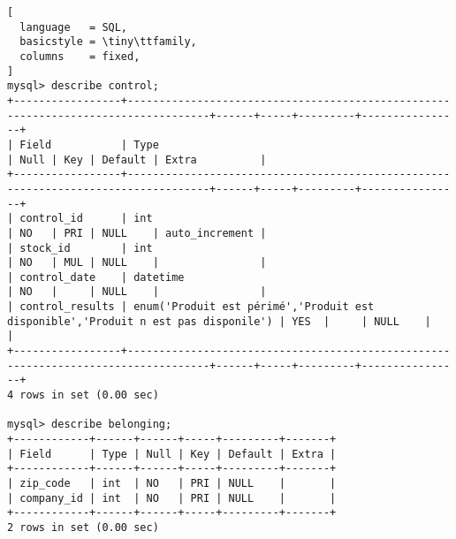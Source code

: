 \begin{landscape}
\begin{lstlisting}[
  language   = SQL,
  basicstyle = \tiny\ttfamily,
  columns    = fixed,
]
mysql> describe control;
+-----------------+-----------------------------------------------------------------------------------+------+-----+---------+----------------+
| Field           | Type                                                                              | Null | Key | Default | Extra          |
+-----------------+-----------------------------------------------------------------------------------+------+-----+---------+----------------+
| control_id      | int                                                                               | NO   | PRI | NULL    | auto_increment |
| stock_id        | int                                                                               | NO   | MUL | NULL    |                |
| control_date    | datetime                                                                          | NO   |     | NULL    |                |
| control_results | enum('Produit est périmé','Produit est disponible','Produit n est pas disponile') | YES  |     | NULL    |                |
+-----------------+-----------------------------------------------------------------------------------+------+-----+---------+----------------+
4 rows in set (0.00 sec)

mysql> describe belonging;
+------------+------+------+-----+---------+-------+
| Field      | Type | Null | Key | Default | Extra |
+------------+------+------+-----+---------+-------+
| zip_code   | int  | NO   | PRI | NULL    |       |
| company_id | int  | NO   | PRI | NULL    |       |
+------------+------+------+-----+---------+-------+
2 rows in set (0.00 sec)
\end{lstlisting}
\end{landscape}
